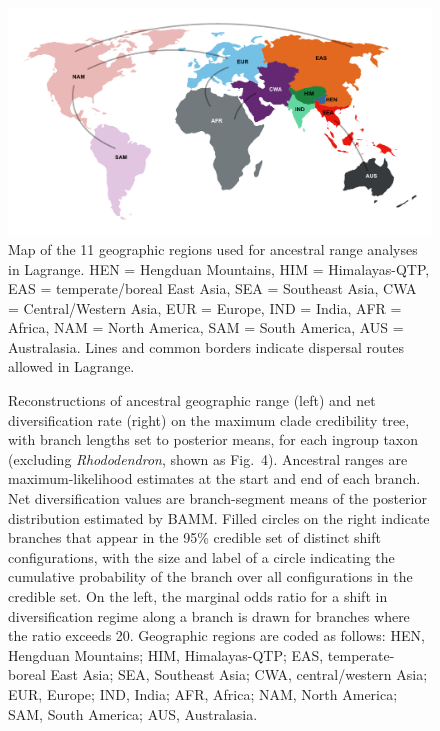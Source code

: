\begin{figure}
\centering
\includegraphics[width=.99\linewidth]{figures/regions.pdf}
\caption{Map of the 11 geographic regions used for ancestral range
  analyses in Lagrange.  HEN = Hengduan Mountains, HIM =
  Himalayas-QTP, EAS = temperate/boreal East Asia, SEA = Southeast
  Asia, CWA = Central/Western Asia, EUR = Europe, IND = India, AFR =
  Africa, NAM = North America, SAM = South America, AUS =
  Australasia. Lines and common borders indicate dispersal routes
  allowed in Lagrange.}
\label{fig:regions}
\end{figure}


\begin{figure}
  \caption{Reconstructions of ancestral geographic range (left) and
    net diversification rate (right) on the maximum clade credibility
    tree, with branch lengths set to posterior means, for each ingroup
    taxon (excluding \textit{Rhododendron}, shown as
    Fig.~4). Ancestral ranges are maximum-likelihood estimates at the
    start and end of each branch. Net diversification values are
    branch-segment means of the posterior distribution estimated by
    BAMM. Filled circles on the right indicate branches that appear in
    the 95\% credible set of distinct shift configurations, with the
    size and label of a circle indicating the cumulative probability
    of the branch over all configurations in the credible set. On the
    left, the marginal odds ratio for a shift in diversification
    regime along a branch is drawn for branches where the ratio
    exceeds 20. Geographic regions are coded as follows: HEN, Hengduan
    Mountains; HIM, Himalayas-QTP; EAS, temperate-boreal East Asia;
    SEA, Southeast Asia; CWA, central/western Asia; EUR, Europe; IND,
    India; AFR, Africa; NAM, North America; SAM, South America; AUS,
    Australasia.}
  \label{fig:ancranges}
\end{figure}

